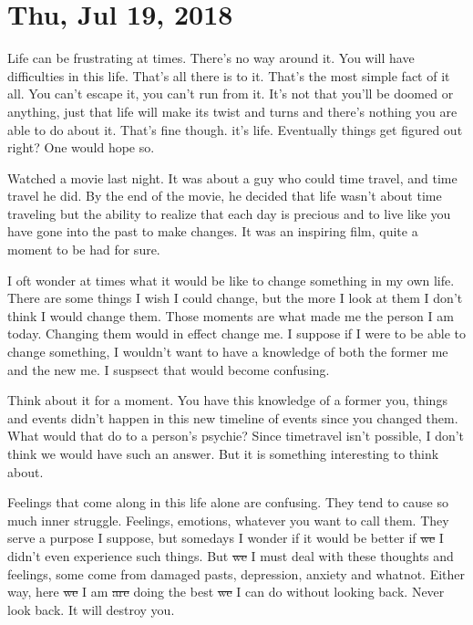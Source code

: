 \section{Thu, Jul 19, 2018}

Life can be frustrating at times. There's no way around it. You will have
difficulties in this life. That's all there is to it. That's the most simple
fact of it all. You can't escape it, you can't run from it. It's not that you'll
be doomed or anything, just that life will make its twist and turns and there's
nothing you are able to do about it. That's fine though. it's life. Eventually
things get figured out right? One would hope so.

Watched a movie last night. It was about a guy who could time travel, and time
travel he did. By the end of the movie, he decided that life wasn't about time
traveling but the ability to realize that each day is precious and to live like
you have gone into the past to make changes. It was an inspiring film, quite a
moment to be had for sure.

I oft wonder at times what it would be like to change something in my own life.
There are some things I wish I could change, but the more I look at them I don't
think I would change them. Those moments are what made me the person I am today.
Changing them would in effect change me. I suppose if I were to be able to
change something, I wouldn't want to have a knowledge of both the former me and
the new me. I suspsect that would become confusing.

Think about it for a moment. You have this knowledge of a former you, things and
events didn't happen in this new timeline of events since you changed them. What
would that do to a person's psychie? Since timetravel isn't possible, I don't
think we would have such an answer. But it is something interesting to think
about.

Feelings that come along in this life alone are confusing. They tend to cause so
much inner struggle. Feelings, emotions, whatever you want to call them. They
serve a purpose I suppose, but somedays I wonder if it would be better if
\st{we} I didn't even experience such things. But \st{we} I must deal with these 
thoughts and feelings, some come from damaged pasts, depression, anxiety and 
whatnot. Either way, here \st{we} I am \st{are} doing the best \st{we} I can do 
without looking back. Never look back. It will destroy you.